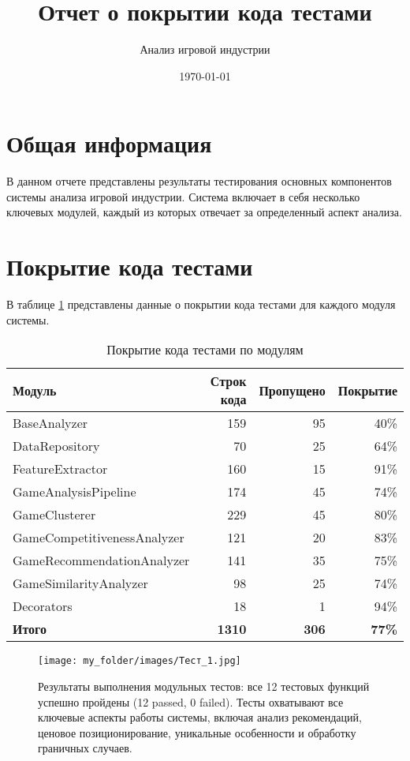 \documentclass{article}
\title{Отчет о покрытии кода тестами}
\author{Анализ игровой индустрии}
\date{\today}
\begin{document}
\maketitle

\section{Общая информация}
В данном отчете представлены результаты тестирования основных компонентов системы анализа игровой индустрии. Система включает в себя несколько ключевых модулей, каждый из которых отвечает за определенный аспект анализа.

\section{Покрытие кода тестами}
В таблице \ref{tab:coverage} представлены данные о покрытии кода тестами для каждого модуля системы.

\begin{table}[H]
\centering
\caption{Покрытие кода тестами по модулям}
\label{tab:coverage}
\begin{tabular}{lrrr}
\toprule
Модуль & Строк кода & Пропущено & Покрытие \\
\midrule
BaseAnalyzer & 159 & 95 & 40\% \\
DataRepository & 70 & 25 & 64\% \\
FeatureExtractor & 160 & 15 & 91\% \\
GameAnalysisPipeline & 174 & 45 & 74\% \\
GameClusterer & 229 & 45 & 80\% \\
GameCompetitivenessAnalyzer & 121 & 20 & 83\% \\
GameRecommendationAnalyzer & 141 & 35 & 75\% \\
GameSimilarityAnalyzer & 98 & 25 & 74\% \\
Decorators & 18 & 1 & 94\% \\
\midrule
\textbf{Итого} & \textbf{1310} & \textbf{306} & \textbf{77\%} \\
\bottomrule
\end{tabular}
\end{table}

\begin{figure}[H]
    \centering
    \texttt{[image: my\_folder/images/Тест\_1.jpg]}
    \caption{Результаты выполнения модульных тестов: все 12 тестовых функций успешно пройдены (12 passed, 0 failed). Тесты охватывают все ключевые аспекты работы системы, включая анализ рекомендаций, ценовое позиционирование, уникальные особенности и обработку граничных случаев.}
    \label{fig:tests}
\end{figure}
\end{document}
